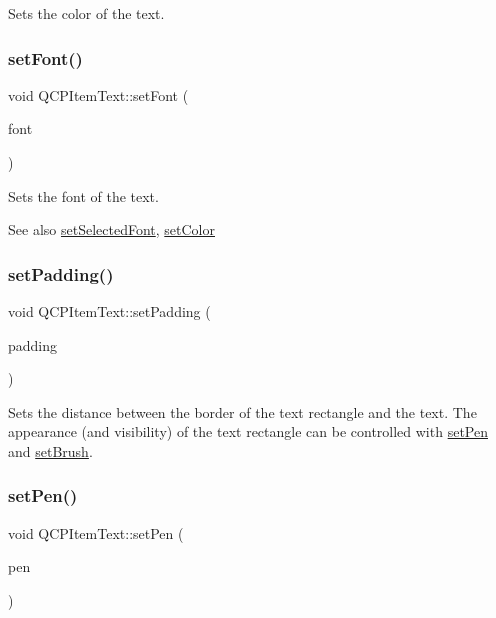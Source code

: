 Sets the color of the text. \mbox{\label{class_q_c_p_item_text_a94ad60ebe04f5c07c35e7c2029e96b1f}} 
\subsubsection{\texorpdfstring{setFont()}{setFont()}}
{\footnotesize\ttfamily void Q\+C\+P\+Item\+Text\+::set\+Font (\begin{DoxyParamCaption}\item[{const Q\+Font \&}]{font }\end{DoxyParamCaption})}

Sets the font of the text.

\begin{DoxySeeAlso}{See also}
\mbox{\hyperlink{class_q_c_p_item_text_a0be2841772f83663c4db307928b82816}{set\+Selected\+Font}}, \mbox{\hyperlink{class_q_c_p_item_text_aa51efc0841fe52da9eaf8aff6fc8a8b2}{set\+Color}} 
\end{DoxySeeAlso}
\mbox{\label{class_q_c_p_item_text_aeea8a3e01f135f9dd0bb08f51db66310}} 
\subsubsection{\texorpdfstring{setPadding()}{setPadding()}}
{\footnotesize\ttfamily void Q\+C\+P\+Item\+Text\+::set\+Padding (\begin{DoxyParamCaption}\item[{const Q\+Margins \&}]{padding }\end{DoxyParamCaption})}

Sets the distance between the border of the text rectangle and the text. The appearance (and visibility) of the text rectangle can be controlled with \mbox{\hyperlink{class_q_c_p_item_text_a9b9ec6eea0eb0603977ff84d4c78d0a3}{set\+Pen}} and \mbox{\hyperlink{class_q_c_p_item_text_a1c7e131516df2ed8d941ef31240ded8e}{set\+Brush}}. \mbox{\label{class_q_c_p_item_text_a9b9ec6eea0eb0603977ff84d4c78d0a3}} 
\subsubsection{\texorpdfstring{setPen()}{setPen()}}
{\footnotesize\ttfamily void Q\+C\+P\+Item\+Text\+::set\+Pen (\begin{DoxyParamCaption}\item[{const Q\+Pen \&}]{pen }\end{DoxyParamCaption})}


